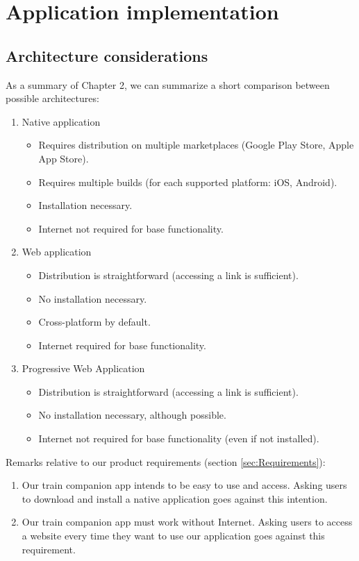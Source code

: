 \chapter{Application implementation}

\section{Architecture considerations}
As a summary of Chapter 2, we can summarize a short comparison between possible architectures:

\begin{enumerate}
    \item Native application
          \begin{itemize}
              \item Requires distribution on multiple marketplaces (Google Play Store, Apple App Store).
              \item Requires multiple builds (for each supported platform: iOS, Android).
              \item Installation necessary.
              \item Internet not required for base functionality.
          \end{itemize}
    \item Web application
          \begin{itemize}
              \item Distribution is straightforward (accessing a link is sufficient).
              \item No installation necessary.
              \item Cross-platform by default.
              \item Internet required for base functionality.
          \end{itemize}
    \item Progressive Web Application
          \begin{itemize}
              \item Distribution is straightforward (accessing a link is sufficient).
              \item No installation necessary, although possible.
              \item Internet not required for base functionality (even if not installed).
          \end{itemize}
\end{enumerate}

Remarks relative to our product requirements (section \ref{sec:Requirements}):
\begin{enumerate}
    \item Our train companion app intends to be easy to use and access. Asking users to download and install a native application goes against this intention.
    \item Our train companion app must work without Internet. Asking users to access a website every time they want to use our application goes against this requirement.
\end{enumerate}

